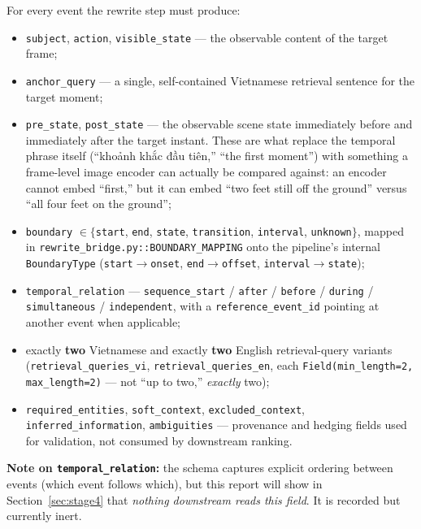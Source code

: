 \documentclass[11pt]{article}
\newcommand{\code}[1]{\texttt{\small #1}}
\newcommand{\file}[1]{\texttt{\footnotesize #1}}
\newcommand{\corr}[1]{\textbf{\textcolor{red!60!black}{#1}}}
\begin{document}
For every event the rewrite step must produce:
\begin{itemize}[nosep]
  \item \code{subject}, \code{action}, \code{visible\_state} --- the observable
    content of the target frame;
  \item \code{anchor\_query} --- a single, self-contained Vietnamese retrieval
    sentence for the target moment;
  \item \code{pre\_state}, \code{post\_state} --- the observable scene state
    immediately before and immediately after the target instant. These are
    what replace the temporal phrase itself (``khoảnh khắc đầu tiên,'' ``the
    first moment'') with something a frame-level image encoder can actually
    be compared against: an encoder cannot embed ``first,'' but it can embed
    ``two feet still off the ground'' versus ``all four feet on the ground'';
  \item \code{boundary} $\in \{$\code{start}, \code{end}, \code{state},
    \code{transition}, \code{interval}, \code{unknown}$\}$, mapped in
    \file{rewrite\_bridge.py::BOUNDARY\_MAPPING} onto the pipeline's internal
    \code{BoundaryType} (\code{start}$\to$\code{onset},
    \code{end}$\to$\code{offset}, \code{interval}$\to$\code{state});
  \item \code{temporal\_relation} --- \code{sequence\_start} / \code{after} /
    \code{before} / \code{during} / \code{simultaneous} / \code{independent},
    with a \code{reference\_event\_id} pointing at another event when
    applicable;
  \item exactly \textbf{two} Vietnamese and exactly \textbf{two} English
    retrieval-query variants (\code{retrieval\_queries\_vi},
    \code{retrieval\_queries\_en}, each \code{Field(min\_length=2,
    max\_length=2)} --- not ``up to two,'' \emph{exactly} two);
  \item \code{required\_entities}, \code{soft\_context},
    \code{excluded\_context}, \code{inferred\_information}, \code{ambiguities}
    --- provenance and hedging fields used for validation, not consumed by
    downstream ranking.
\end{itemize}

\corr{Note on \code{temporal\_relation}:} the schema captures explicit
ordering between events (which event follows which), but this report will
show in Section~\ref{sec:stage4} that \emph{nothing downstream reads this
field}. It is recorded but currently inert.
\end{document}
